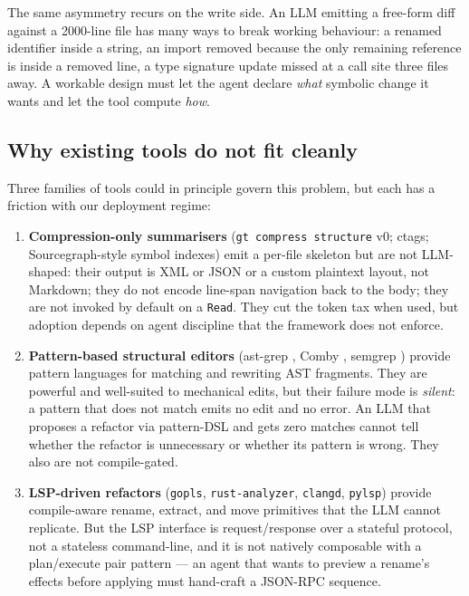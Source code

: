 The same asymmetry recurs on the write side. An LLM emitting a
free-form diff against a 2000-line file has many ways to break working
behaviour: a renamed identifier inside a string, an import removed
because the only remaining reference is inside a removed line, a
type signature update missed at a call site three files away. A
workable design must let the agent declare \emph{what} symbolic change
it wants and let the tool compute \emph{how}.

\subsection{Why existing tools do not fit cleanly}

Three families of tools could in principle govern this problem, but
each has a friction with our deployment regime:

\begin{enumerate}[leftmargin=*]
  \item \textbf{Compression-only summarisers}
        (\texttt{gt compress structure} v0; ctags;
        Sourcegraph-style symbol indexes) emit a per-file skeleton
        but are not LLM-shaped: their output is XML or JSON or
        a custom plaintext layout, not Markdown; they do not encode
        line-span navigation back to the body; they are not invoked
        by default on a \texttt{Read}. They cut the token tax when
        used, but adoption depends on agent discipline that the
        framework does not enforce.

  \item \textbf{Pattern-based structural editors} (ast-grep
        \cite{ast_grep}, Comby \cite{comby}, semgrep
        \cite{semgrep}) provide pattern languages for matching and
        rewriting AST fragments. They are powerful and well-suited
        to mechanical edits, but their failure mode is \emph{silent}:
        a pattern that does not match emits no edit and no error.
        An LLM that proposes a refactor via pattern-DSL and gets
        zero matches cannot tell whether the refactor is unnecessary
        or whether its pattern is wrong. They also are not
        compile-gated.

  \item \textbf{LSP-driven refactors}
        (\texttt{gopls}, \texttt{rust-analyzer}, \texttt{clangd},
        \texttt{pylsp}) provide compile-aware rename, extract, and
        move primitives that the LLM cannot replicate. But the LSP
        interface is request/response over a stateful protocol, not
        a stateless command-line, and it is not natively composable
        with a plan/execute pair pattern --- an agent that wants
        to preview a rename's effects before applying must hand-craft
        a JSON-RPC sequence.
\end{enumerate}

